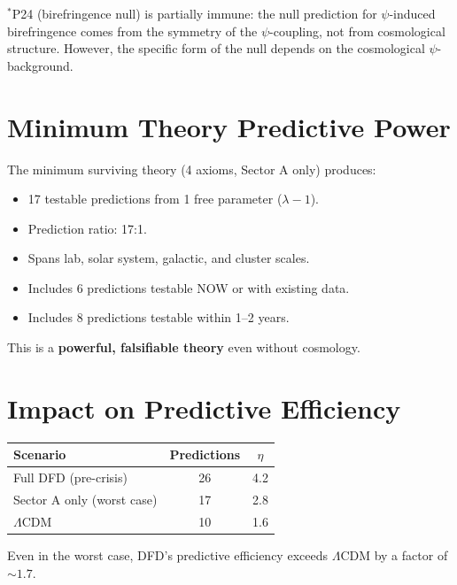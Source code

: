 \documentclass[11pt]{article}
\begin{document}
$^*$P24 (birefringence null) is partially immune: the null prediction
for $\psi$-induced birefringence comes from the symmetry of the
$\psi$-coupling, not from cosmological structure. However, the
specific form of the null depends on the cosmological $\psi$-background.

\section{Minimum Theory Predictive Power}

The minimum surviving theory (4 axioms, Sector A only) produces:
\begin{itemize}
\item 17 testable predictions from 1 free parameter ($\lambda - 1$).
\item Prediction ratio: 17:1.
\item Spans lab, solar system, galactic, and cluster scales.
\item Includes 6 predictions testable NOW or with existing data.
\item Includes 8 predictions testable within 1--2 years.
\end{itemize}

This is a \textbf{powerful, falsifiable theory} even without cosmology.

\section{Impact on Predictive Efficiency}

\begin{table}[h]
\centering
\begin{tabular}{lcc}
\toprule
\textbf{Scenario} & \textbf{Predictions} & $\eta$ \\
\midrule
Full DFD (pre-crisis) & 26 & 4.2 \\
Sector A only (worst case) & 17 & 2.8 \\
$\Lambda$CDM & 10 & 1.6 \\
\bottomrule
\end{tabular}
\end{table}

Even in the worst case, DFD's predictive efficiency exceeds $\Lambda$CDM
by a factor of $\sim 1.7$.
\end{document}
